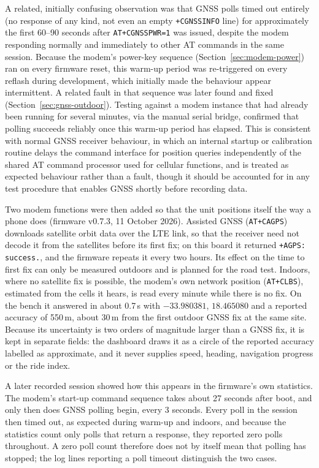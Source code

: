 A related, initially confusing observation was that GNSS polls timed out entirely (no response of any kind, not even an empty \texttt{+CGNSSINFO} line) for approximately the first 60--90 seconds after \texttt{AT+CGNSSPWR=1} was issued, despite the modem responding normally and immediately to other AT commands in the same session. Because the modem's power-key sequence (Section~\ref{sec:modem-power}) ran on every firmware reset, this warm-up period was re-triggered on every reflash during development, which initially made the behaviour appear intermittent. A related fault in that sequence was later found and fixed (Section~\ref{sec:gnss-outdoor}). Testing against a modem instance that had already been running for several minutes, via the manual serial bridge, confirmed that polling succeeds reliably once this warm-up period has elapsed. This is consistent with normal GNSS receiver behaviour, in which an internal startup or calibration routine delays the command interface for position queries independently of the shared AT command processor used for cellular functions, and is treated as expected behaviour rather than a fault, though it should be accounted for in any test procedure that enables GNSS shortly before recording data.

Two modem functions were then added so that the unit positions itself the way a phone does (firmware v0.7.3, 11 October 2026). Assisted GNSS (\texttt{AT+CAGPS}) downloads satellite orbit data over the LTE link, so that the receiver need not decode it from the satellites before its first fix; on this board it returned \texttt{+AGPS: success.}, and the firmware repeats it every two hours. Its effect on the time to first fix can only be measured outdoors and is planned for the road test. Indoors, where no satellite fix is possible, the modem's own network position (\texttt{AT+CLBS}), estimated from the cells it hears, is read every minute while there is no fix. On the bench it answered in about 0.7\,s with $-33.980381$, $18.465080$ and a reported accuracy of 550\,m, about 30\,m from the first outdoor GNSS fix at the same site. Because its uncertainty is two orders of magnitude larger than a GNSS fix, it is kept in separate fields: the dashboard draws it as a circle of the reported accuracy labelled as approximate, and it never supplies speed, heading, navigation progress or the ride index.

A later recorded session showed how this appears in the firmware's own statistics. The modem's start-up command sequence takes about 27 seconds after boot, and only then does GNSS polling begin, every 3 seconds. Every poll in the session then timed out, as expected during warm-up and indoors, and because the statistics count only polls that return a response, they reported zero polls throughout. A zero poll count therefore does not by itself mean that polling has stopped; the log lines reporting a poll timeout distinguish the two cases.

